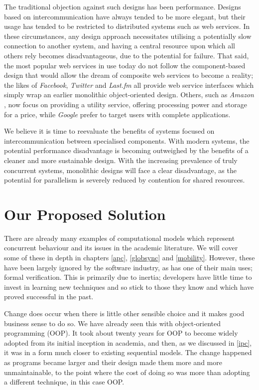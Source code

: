 The traditional objection against such designs has been performance.
Designs based on intercommunication have always tended to be more
elegant, but their usage has tended to be restricted to distributed
systems such as web services.  In these circumstances, any design
approach necessitates utilising a potentially slow connection to
another system, and having a central resource upon which all others
rely becomes disadvantageous, due to the potential for failure.  That
said, the most popular web services in use today do not follow the
component-based design that would allow the dream of composite web
services \cite{cashews-sem} to become a reality; the likes of
\emph{Facebook}, \emph{Twitter} and \emph{Last.fm} \cite{facebook,
  amazon, twitter, lastfm} all provide web service interfaces which
simply wrap an earlier monolithic object-oriented design.  Others,
such as \emph{Amazon} \cite{amazon}, now focus on providing a utility
service, offering processing power and storage for a price, while
\emph{Google} \cite{google} prefer to target users with complete
applications.

We believe it is time to reevaluate the benefits of systems focused on
intercommunication between specialised components.  With modern
systems, the potential performance disadvantage is becoming outweighed
by the benefits of a cleaner and more sustainable design.  With the
increasing prevalence of truly concurrent systems, monolithic designs
will face a clear disadvantage, as the potential for parallelism is
severely reduced by contention for shared resources.

\section{Our Proposed Solution}
\label{solution}

There are already many examples of computational models which
represent concurrent behaviour and its issues in the academic
literature.  We will cover some of these in depth in chapters \ref{apc},
\ref{globsync} and \ref{mobility}.  However, these have
been largely ignored by the software industry, as has one of their
main uses; formal verification.  This is primarily due to inertia;
developers have little time to invest in learning new techniques and
so stick to those they know and which have proved successful in the
past.

Change does occur when there is little other sensible choice and it
makes good business sense to do so.  We have already seen this with
object-oriented programming (OOP). It took about twenty years for OOP
to become widely adopted from its initial inception in academia, and
then, as we discussed in \ref{ipc}, it was in a form much closer to
existing sequential models.  The change happened as programs became
larger and their design made them more and more unmaintainable, to the
point where the cost of doing so was more than adopting a different
technique, in this case OOP.


